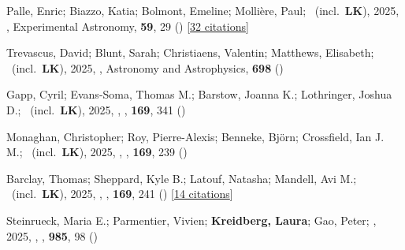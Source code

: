 \item[{\color{numcolor}\scriptsize139}] Palle, Enric; Biazzo, Katia; Bolmont, Emeline; Molli{\`e}re, Paul; \etal\ (incl.\ \textbf{LK}), 2025, , Experimental Astronomy, \textbf{59}, 29 () [\href{https://ui.adsabs.harvard.edu/abs/2025ExA....59...29P}{32 citations}]

\item[{\color{numcolor}\scriptsize138}] Trevascus, David; Blunt, Sarah; Christiaens, Valentin; Matthews, Elisabeth; \etal\ (incl.\ \textbf{LK}), 2025, , Astronomy and Astrophysics, \textbf{698} ()

\item[{\color{numcolor}\scriptsize137}] Gapp, Cyril; Evans-Soma, Thomas M.; Barstow, Joanna K.; Lothringer, Joshua D.; \etal\ (incl.\ \textbf{LK}), 2025, , \aj, \textbf{169}, 341 ()

\item[{\color{numcolor}\scriptsize136}] Monaghan, Christopher; Roy, Pierre-Alexis; Benneke, Bj{\"o}rn; Crossfield, Ian J. M.; \etal\ (incl.\ \textbf{LK}), 2025, , \aj, \textbf{169}, 239 ()

\item[{\color{numcolor}\scriptsize135}] Barclay, Thomas; Sheppard, Kyle B.; Latouf, Natasha; Mandell, Avi M.; \etal\ (incl.\ \textbf{LK}), 2025, , \aj, \textbf{169}, 241 () [\href{https://ui.adsabs.harvard.edu/abs/2025AJ....169..241B}{14 citations}]

\item[{\color{numcolor}\scriptsize134}] Steinrueck, Maria E.; Parmentier, Vivien; \textbf{Kreidberg, Laura}; Gao, Peter; \etal, 2025, , \apj, \textbf{985}, 98 ()

